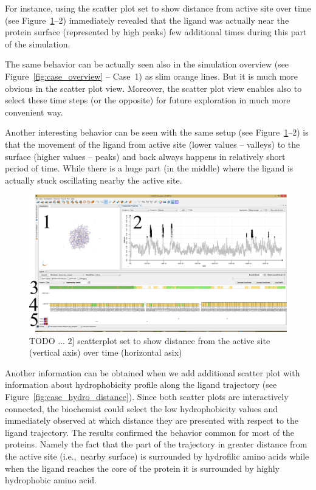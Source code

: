 \documentclass[twocolumn]{bmcart}%
\newcommand{\ie}{i.e.,~}
\begin{document}
For instance, using the scatter plot set to show distance from active site over time (see Figure~\ref{fig:case_example1}--2) immediately revealed that the ligand was actually near the protein surface (represented by high peaks) few additional times during this part of the simulation.


The same behavior can be actually seen also in the simulation overview (see Figure~\ref{fig:case_overview} -- Case~1) as slim orange lines. 
But it is much more obvious in the scatter plot view.
Moreover, the scatter plot view enables also to select these time steps (or the opposite) for future exploration in much more convenient way. 

Another interesting behavior can be seen with the same setup (see Figure~\ref{fig:case_example1}--2) is that the movement of the ligand from active site (lower values -- valleys) to the surface (higher values -- peaks) and back always happens in relatively short period of time. 
{\color{red}While there is a huge part (in the middle) where the ligand is actually stuck oscillating nearby the active site.}

\begin{figure}[htb]
	\centering
  \includegraphics[width=0.95\linewidth]{img/case_example_1.pdf}
  \caption{\label{fig:case_example1} {\color{red}TODO} ... 2] scatterplot set to show distance from the active site (vertical axis) over time (horizontal asix)}
\end{figure}

Another information can be obtained when we add additional scatter plot with information about hydrophobicity profile along the ligand trajectory (see Figure~\ref{fig:case_hydro_distance}). 
Since both scatter plots are interactively connected, the biochemist could select the low hydrophobicity values and immediately observed at which distance they are presented with respect to the ligand trajectory. 
The results confirmed the behavior common for most of the proteins.
Namely the fact that the part of the trajectory in greater distance from the active site (\ie nearby surface) is surrounded by hydrofilic amino acids while when the ligand reaches the core of the protein it is surrounded by highly hydrophobic amino acid.
\end{document}
